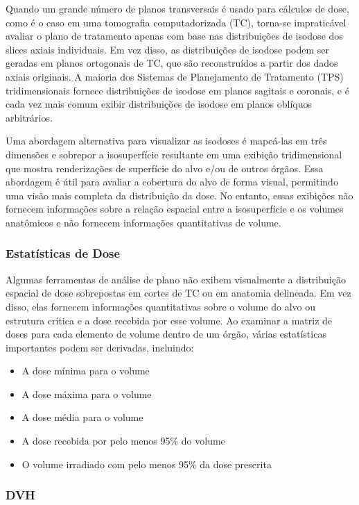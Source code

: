 \documentclass[11pt,a4paper]{article}
\begin{document}
	Quando um grande número de planos transversais é usado para cálculos de dose, como é o caso em uma tomografia computadorizada (TC), torna-se impraticável avaliar o plano de tratamento apenas com base nas distribuições de isodose dos slices axiais individuais. Em vez disso, as distribuições de isodose podem ser geradas em planos ortogonais de TC, que são reconstruídos a partir dos dados axiais originais. A maioria dos Sistemas de Planejamento de Tratamento (TPS) tridimensionais fornece distribuições de isodose em planos sagitais e coronais, e é cada vez mais comum exibir distribuições de isodose em planos oblíquos arbitrários.

	Uma abordagem alternativa para visualizar as isodoses é mapeá-las em três dimensões e sobrepor a isosuperfície resultante em uma exibição tridimensional que mostra renderizações de superfície do alvo e/ou de outros órgãos. Essa abordagem é útil para avaliar a cobertura do alvo de forma visual, permitindo uma visão mais completa da distribuição da dose. No entanto, essas exibições não fornecem informações sobre a relação espacial entre a isosuperfície e os volumes anatômicos e não fornecem informações quantitativas de volume.

	

\subsubsection*{Estatísticas de Dose}

	Algumas ferramentas de análise de plano não exibem visualmente a distribuição espacial de dose sobrepostas em cortes de TC ou em anatomia delineada. Em vez disso, elas fornecem informações quantitativas sobre o volume do alvo ou estrutura crítica e a dose recebida por esse volume. Ao examinar a matriz de doses para cada elemento de volume dentro de um órgão, várias estatísticas importantes podem ser derivadas, incluindo:

	\begin{itemize}
		\item A dose mínima para o volume
		\item A dose máxima para o volume
		\item A dose média para o volume
		\item A dose recebida por pelo menos 95\% do volume
		\item O volume irradiado com pelo menos 95\% da dose prescrita
	\end{itemize}

\subsubsection*{DVH}
\end{document}
